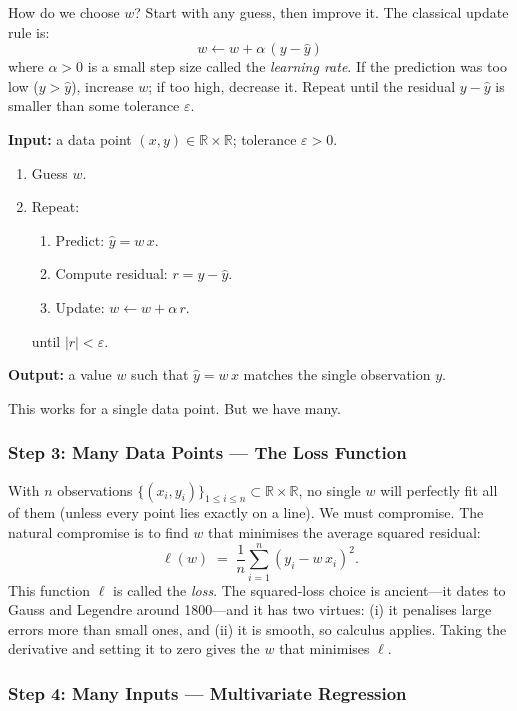 \documentclass[11pt,a4paper]{article}
\theoremstyle{definition}
\theoremstyle{plain}
\theoremstyle{remark}
\begin{document}
How do we choose $w$? Start with any guess, then improve it. The classical update rule is:
\[
  w \leftarrow w + \alpha\, (y - \hat{y})
\]
where $\alpha > 0$ is a small step size called the \emph{learning rate}. If the prediction was too low ($y > \hat{y}$), increase $w$; if too high, decrease it. Repeat until the residual $y - \hat{y}$ is smaller than some tolerance $\varepsilon$.

\begin{keyinsight}[title={The Learning Algorithm}]
\textbf{Input:} a data point $(x, y) \in \mathbb{R} \times \mathbb{R}$; tolerance $\varepsilon > 0$.
\begin{enumerate}[nosep]
  \item Guess $w$.
  \item Repeat:
  \begin{enumerate}[nosep]
    \item Predict: $\hat{y} = w\, x$.
    \item Compute residual: $r = y - \hat{y}$.
    \item Update: $w \leftarrow w + \alpha\, r$.
  \end{enumerate}
  until $|r| < \varepsilon$.
\end{enumerate}
\textbf{Output:} a value $w$ such that $\hat{y} = w\, x$ matches the single observation $y$.
\end{keyinsight}

This works for a single data point. But we have many.

\subsubsection*{Step 3: Many Data Points --- The Loss Function}

With $n$ observations $\{(x_i, y_i)\}_{1 \le i \le n} \subset \mathbb{R} \times \mathbb{R}$, no single $w$ will perfectly fit all of them (unless every point lies exactly on a line). We must compromise. The natural compromise is to find $w$ that minimises the average squared residual:
\[
  \ell(w) \;=\; \frac{1}{n} \sum_{i=1}^{n} (y_i - w\, x_i)^2.
\]
This function $\ell$ is called the \emph{loss}. The squared-loss choice is ancient---it dates to Gauss and Legendre around 1800---and it has two virtues: (i) it penalises large errors more than small ones, and (ii) it is smooth, so calculus applies. Taking the derivative and setting it to zero gives the $w$ that minimises $\ell$.

\subsubsection*{Step 4: Many Inputs --- Multivariate Regression}
\end{document}
